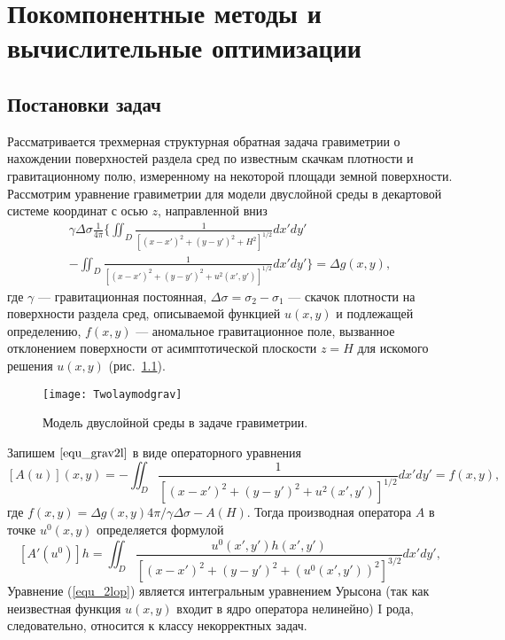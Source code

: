 \chapter{Покомпонентные методы и вычислительные оптимизации}

\section{Постановки задач}

Рассматривается трехмерная структурная обратная задача гравиметрии о нахождении поверхностей раздела сред по известным скачкам плотности и гравитационному полю, измеренному на некоторой площади земной поверхности.
Рассмотрим уравнение гравиметрии для модели двуслойной среды в декартовой системе координат с осью $z$, направленной вниз 
\begin{equation}\label{equ_grav2l}
\begin{aligned}
\gamma\Delta\sigma\frac{1}{4\pi} \bigg\{ \iint_{D} \frac{1}{[(x-x')^2+(y-y')^2+H^2]^{1/2}}dx'dy' \\
- 
\iint_{D} \frac{1}{[(x-x')^2+(y-y')^2+u^2(x',y')]^{1/2}}dx'dy'\bigg\}=\Delta g(x,y),
\end{aligned} 
\end{equation}
где $\gamma$ --- гравитационная постоянная, $\Delta\sigma=\sigma_2-\sigma_1$ --- скачок плотности на поверхности раздела сред, описываемой функцией $u(x,y)$ и подлежащей определению, $f(x,y)$ --- аномальное гравитационное поле, вызванное отклонением поверхности от асимптотической плоскости $z=H$ для искомого решения $u(x,y)$ (рис.~\ref{fig:twolayergrav}). 
\begin{figure}
	\centering
	\texttt{[image: Twolaymodgrav]}
	\caption{Модель двуслойной среды в задаче гравиметрии.}
	\label{fig:twolayergrav}
\end{figure}
Запишем $\eqref{equ_grav2l}$ в виде операторного уравнения
\begin{equation}\label{equ_2lop}
[A(u)](x,y)=-\iint_{D} \frac{1}{[(x-x')^2+(y-y')^2+u^2(x',y')]^{1/2}}dx'dy'=f(x,y),
\end{equation}
где $f(x,y)=\Delta g(x,y) 4\pi/\gamma\Delta\sigma - A(H)$. Тогда производная оператора $A$ в точке $u^0(x,y)$ определяется формулой
$$ [A'(u^0)]h=\iint_{D} \frac{u^0(x',y')h(x',y')}{[(x-x')^2+(y-y')^2+(u^0(x',y'))^2]^{3/2}}dx'dy', $$
Уравнение (\ref{equ_2lop}) является интегральным уравнением Урысона (так как неизвестная функция $u(x,y)$ входит в ядро оператора нелинейно) I рода, следовательно, относится к классу некорректных задач.

